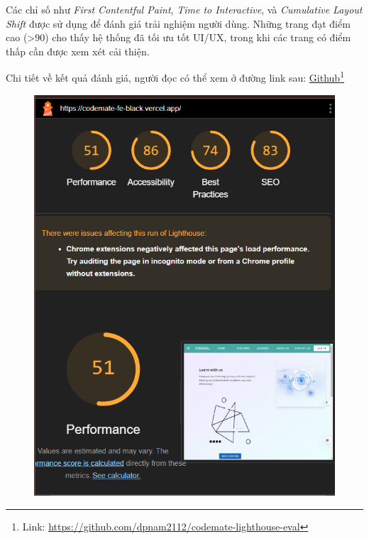 Các chỉ số như \textit{First Contentful Paint}, \textit{Time to Interactive}, và \textit{Cumulative Layout Shift} được sử dụng để đánh giá trải nghiệm người dùng. Những trang đạt điểm cao (>90) cho thấy hệ thống đã tối ưu tốt UI/UX, trong khi các trang có điểm thấp cần được xem xét cải thiện.

Chi tiết về kết quả đánh giá, người đọc có thể xem ở đường link sau: \href{https://github.com/dpnam2112/codemate-lighthouse-eval}{Github}\footnote{Link: \url{https://github.com/dpnam2112/codemate-lighthouse-eval}}

\begin{figure}[H]
\centering
\begin{minipage}{0.45\textwidth}
  \centering
  \includegraphics[width=\linewidth]{images/lighthouse_landing_space.png}
\end{minipage}
\hfill
\begin{minipage}{0.45\textwidth}
  \centering

\end{minipage}
\end{figure}
